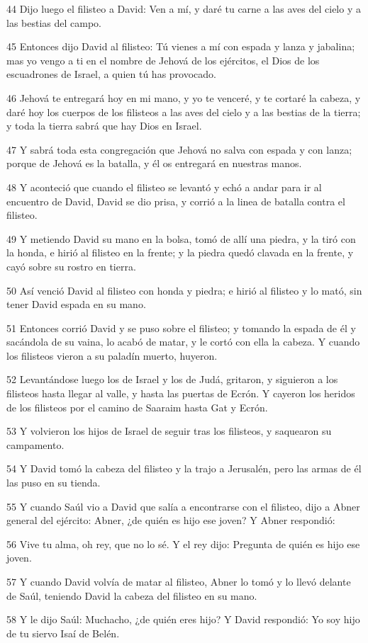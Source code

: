 \par 44 Dijo luego el filisteo a David: Ven a mí, y daré tu carne a las aves del cielo y a las bestias del campo.
\par 45 Entonces dijo David al filisteo: Tú vienes a mí con espada y lanza y jabalina; mas yo vengo a ti en el nombre de Jehová de los ejércitos, el Dios de los escuadrones de Israel, a quien tú has provocado.
\par 46 Jehová te entregará hoy en mi mano, y yo te venceré, y te cortaré la cabeza, y daré hoy los cuerpos de los filisteos a las aves del cielo y a las bestias de la tierra; y toda la tierra sabrá que hay Dios en Israel.
\par 47 Y sabrá toda esta congregación que Jehová no salva con espada y con lanza; porque de Jehová es la batalla, y él os entregará en nuestras manos.
\par 48 Y aconteció que cuando el filisteo se levantó y echó a andar para ir al encuentro de David, David se dio prisa, y corrió a la linea de batalla contra el filisteo.
\par 49 Y metiendo David su mano en la bolsa, tomó de allí una piedra, y la tiró con la honda, e hirió al filisteo en la frente; y la piedra quedó clavada en la frente, y cayó sobre su rostro en tierra.
\par 50 Así venció David al filisteo con honda y piedra; e hirió al filisteo y lo mató, sin tener David espada en su mano.
\par 51 Entonces corrió David y se puso sobre el filisteo; y tomando la espada de él y sacándola de su vaina, lo acabó de matar, y le cortó con ella la cabeza. Y cuando los filisteos vieron a su paladín muerto, huyeron.
\par 52 Levantándose luego los de Israel y los de Judá, gritaron, y siguieron a los filisteos hasta llegar al valle, y hasta las puertas de Ecrón. Y cayeron los heridos de los filisteos por el camino de Saaraim hasta Gat y Ecrón.
\par 53 Y volvieron los hijos de Israel de seguir tras los filisteos, y saquearon su campamento. 
\par 54 Y David tomó la cabeza del filisteo y la trajo a Jerusalén, pero las armas de él las puso en su tienda.
\par 55 Y cuando Saúl vio a David que salía a encontrarse con el filisteo, dijo a Abner general del ejército: Abner, ¿de quién es hijo ese joven? Y Abner respondió:
\par 56 Vive tu alma, oh rey, que no lo sé. Y el rey dijo: Pregunta de quién es hijo ese joven.
\par 57 Y cuando David volvía de matar al filisteo, Abner lo tomó y lo llevó delante de Saúl, teniendo David la cabeza del filisteo en su mano.
\par 58 Y le dijo Saúl: Muchacho, ¿de quién eres hijo? Y David respondió: Yo soy hijo de tu siervo Isaí de Belén.

